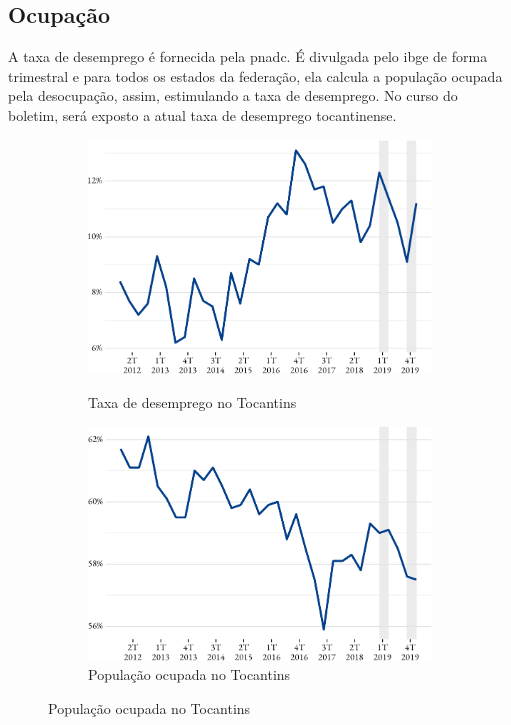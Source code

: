 \subsection{Ocupação}

\par A taxa de desemprego é fornecida pela \acrshort{pnadc}. É divulgada pelo \acrshort{ibge} de forma trimestral e para todos os estados da federação, ela calcula a população ocupada pela desocupação, assim, estimulando a taxa de desemprego. No curso do boletim, será exposto a atual taxa de desemprego tocantinense.

\begin{figure}[!h]
	\begin{subfigure}{\linewidth}
		\caption{Taxa de desemprego no Tocantins}
		\includegraphics{fig/tx_desemprego_to-1.pdf}
		\notes{\trimestres}
		\label{fig:desemprego}
	\end{subfigure}
	\begin{subfigure}{\linewidth}
		\caption{População ocupada no Tocantins}
		\includegraphics{fig/pop_ocupada-1.pdf}

\end{subfigure}
\end{figure}
